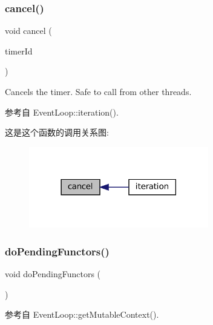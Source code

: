 \subsubsection{\texorpdfstring{cancel()}{cancel()}}
{\footnotesize\ttfamily void cancel (\begin{DoxyParamCaption}\item[{\hyperlink{classmuduo_1_1net_1_1TimerId}{Timer\+Id}}]{timer\+Id }\end{DoxyParamCaption})}

Cancels the timer. Safe to call from other threads. 

参考自 Event\+Loop\+::iteration().

这是这个函数的调用关系图\+:
\nopagebreak
\begin{figure}[H]
\begin{center}
\leavevmode
\includegraphics[width=222pt]{classmuduo_1_1net_1_1EventLoop_af8b24b02bbff6a657fa5b0190bef9b9b_icgraph}
\end{center}
\end{figure}
\mbox{\label{classmuduo_1_1net_1_1EventLoop_a52b9d01f6df5ea016514b924abda1299}} 
\subsubsection{\texorpdfstring{do\+Pending\+Functors()}{doPendingFunctors()}}
{\footnotesize\ttfamily void do\+Pending\+Functors (\begin{DoxyParamCaption}{ }\end{DoxyParamCaption})\hspace{0.3cm}{\ttfamily [private]}}



参考自 Event\+Loop\+::get\+Mutable\+Context().

